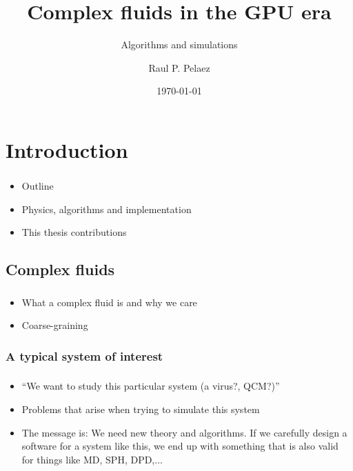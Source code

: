 \documentclass{beamer}
\title{Complex fluids in the GPU era}
\subtitle{Algorithms and simulations}
\author{Raul P. Pelaez}
\institute{Universidad Autónoma de Madrid}
\date{\today}
\begin{document}
\begin{frame}
  \titlepage
\end{frame}

\begin{frame}
  \tableofcontents
\end{frame}

\section{Introduction}
\begin{frame}
  \frametitle{\insertsectionnavigation{\linewidth}}
  \begin{itemize}
  \item Outline
  \item Physics, algorithms and implementation
  \item This thesis contributions
  \end{itemize}
\end{frame}

\subsection{Complex fluids}
\begin{frame}
  \frametitle{\insertsubsectionnavigation{\linewidth}}
  \begin{itemize}
  \item What a complex fluid is and why we care
  \item Coarse-graining
  \end{itemize}
\end{frame}
\subsubsection{A typical system of interest}
\begin{frame}
  \frametitle{\insertsubsectionnavigation{\linewidth}} 
  \framesubtitle{\insertsubsubsection}
  \begin{itemize}
  \item ``We want to study this particular system (a virus?, QCM?)''
  \item Problems that arise when trying to simulate this system
  \item The message is: We need new theory and algorithms. If we carefully design a software for a system like this, we end up with something that is also valid for things like MD,  SPH, DPD,...
  \end{itemize}
\end{frame}
\end{document}
